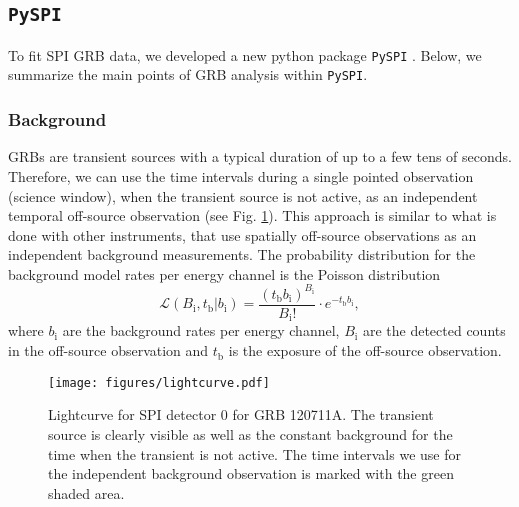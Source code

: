 \documentclass[twocolumn,traditabstract]{aa}
\begin{document}
\subsection{{\tt PySPI}}
\label{pyspi}
To fit SPI GRB data, we developed a new python package {\tt PySPI} \citep{joss}.
Below, we summarize the main points of GRB analysis within {\tt PySPI}.

\subsubsection{Background}

GRBs are transient sources with a typical duration of up to a few tens of seconds. Therefore, we can use the time intervals during a single pointed observation (science window), when the transient source is not active, as an independent temporal off-source observation (see Fig. \ref{fig:lightcurve}). This approach is similar to what is done with other instruments, that use spatially off-source observations as an independent background measurements.
The probability distribution for the background model rates per energy channel is the Poisson distribution
\begin{equation}
	\mathcal{L}(B_{\mathrm{i}}, t_{\mathrm{b}}|b_{\mathrm{i}})=\frac{(t_{\mathrm{b}} b_{\mathrm{i}})^{B_{\mathrm{i}}}}{B_{\mathrm{i}}!}\cdot e^{-t_{\mathrm{b}} b_{\mathrm{i}}},
  \label{eq:poisson_bkg}
\end{equation}
where $b_{\mathrm{i}}$ are the background rates per energy channel, $B_{\mathrm{i}}$ are the detected counts in the off-source observation and $t_{\mathrm{b}}$ is the exposure of the off-source observation.


\begin{figure}
    \begin{centering}
        \texttt{[image: figures/lightcurve.pdf]}
        \caption{Lightcurve for SPI detector 0 for GRB 120711A. The transient source is clearly visible as well as the constant background for the time when the transient is not active. The time intervals we use for the independent background observation is marked with the green shaded area.}
        \label{fig:lightcurve}
    \end{centering}
\end{figure}
\end{document}
